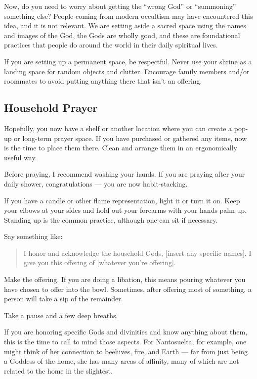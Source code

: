 \documentclass[
]{book}
\begin{document}
Now, do you need to worry about getting the ``wrong God'' or ``summoning'' something else? People coming from modern occultism may have encountered this idea, and it is not relevant. We are setting aside a sacred space using the names and images of the God, the Gods are wholly good, and these are foundational practices that people do around the world in their daily spiritual lives.

If you are setting up a permanent space, be respectful. Never use your shrine as a landing space for random objects and clutter. Encourage family members and/or roommates to avoid putting anything there that isn't an offering.

\hypertarget{household-prayer}{%
\subsection{Household Prayer}\label{household-prayer}}

Hopefully, you now have a shelf or another location where you can create a pop-up or long-term prayer space. If you have purchased or gathered any items, now is the time to place them there. Clean and arrange them in an ergonomically useful way.

Before praying, I recommend washing your hands. If you are praying after your daily shower, congratulations --- you are now habit-stacking.

If you have a candle or other flame representation, light it or turn it on. Keep your elbows at your sides and hold out your forearms with your hands palm-up. Standing up is the common practice, although one can sit if necessary.

Say something like:

\begin{quote}
I honor and acknowledge the household Gods, {[}insert any specific names{]}. I give you this offering of {[}whatever you're offering{]}.
\end{quote}

Make the offering. If you are doing a libation, this means pouring whatever you have chosen to offer into the bowl. Sometimes, after offering most of something, a person will take a sip of the remainder.

Take a pause and a few deep breaths.

If you are honoring specific Gods and divinities and know anything about them, this is the time to call to mind those aspects. For Nantosuelta, for example, one might think of her connection to beehives, fire, and Earth --- far from just being a Goddess of the home, she has many areas of affinity, many of which are not related to the home in the slightest.
\end{document}
